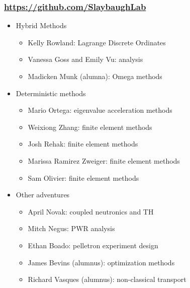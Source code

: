 \documentclass[xcolor=x11names,compress,handout]{beamer}
\renewcommand{\(}{\begin{columns}}
\renewcommand{\)}{\end{columns}}
\newcommand{\<}[1]{\begin{column}{#1}}
\renewcommand{\>}{\end{column}}
\begin{document}
\begin{frame}[fragile]
  \frametitle{\url{https://github.com/SlaybaughLab}}

	\begin{itemize}
	\item Hybrid Methods
	\begin{itemize}
	  \item Kelly Rowland: Lagrange Discrete Ordinates
	  \item Vanessa Goss and Emily Vu: analysis
	  \item Madicken Munk (alumna): Omega methods
	\end{itemize}
	\pause
	\item Deterministic methods
	\begin{itemize}
	  \item Mario Ortega: eigenvalue acceleration methods
	  \item Weixiong Zhang: finite element methods
	  \item Josh Rehak: finite element methods
	  \item Marissa Ramirez Zweiger: finite element methods
	  \item Sam Olivier: finite element methods
	\end{itemize}
	\pause
	\item Other adventures
	\begin{itemize}
	   \item April Novak: coupled neutronics and TH
	  \item Mitch Negus:  PWR analysis
	  \item Ethan Boado: pelletron experiment design
	  \item James Bevins (alumnus): optimization methods
	  \item Richard Vasques (alumnus): non-classical transport
	\end{itemize}
	\end{itemize}

\end{frame}
\end{document}
